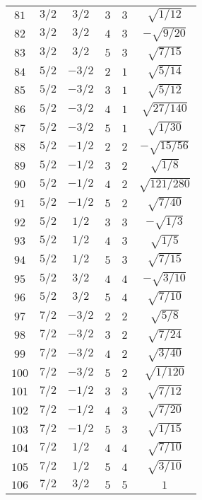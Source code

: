 \begin{table}
\begin{center}
\begin{tabular}{|c|c|c|c|c|c|}
$81$ & $3/2$ & $3/2$ & $3$ & $3$ & $\sqrt{1/12}$ \\ 
$82$ & $3/2$ & $3/2$ & $4$ & $3$ & $-\sqrt{9/20}$ \\ 
$83$ & $3/2$ & $3/2$ & $5$ & $3$ & $\sqrt{7/15}$ \\ 
$84$ & $5/2$ & $-3/2$ & $2$ & $1$ & $\sqrt{5/14}$ \\ 
$85$ & $5/2$ & $-3/2$ & $3$ & $1$ & $\sqrt{5/12}$ \\ 
$86$ & $5/2$ & $-3/2$ & $4$ & $1$ & $\sqrt{27/140}$ \\ 
$87$ & $5/2$ & $-3/2$ & $5$ & $1$ & $\sqrt{1/30}$ \\ 
$88$ & $5/2$ & $-1/2$ & $2$ & $2$ & $-\sqrt{15/56}$ \\ 
$89$ & $5/2$ & $-1/2$ & $3$ & $2$ & $\sqrt{1/8}$ \\ 
$90$ & $5/2$ & $-1/2$ & $4$ & $2$ & $\sqrt{121/280}$ \\ 
$91$ & $5/2$ & $-1/2$ & $5$ & $2$ & $\sqrt{7/40}$ \\ 
$92$ & $5/2$ & $1/2$ & $3$ & $3$ & $-\sqrt{1/3}$ \\ 
$93$ & $5/2$ & $1/2$ & $4$ & $3$ & $\sqrt{1/5}$ \\ 
$94$ & $5/2$ & $1/2$ & $5$ & $3$ & $\sqrt{7/15}$ \\ 
$95$ & $5/2$ & $3/2$ & $4$ & $4$ & $-\sqrt{3/10}$ \\ 
$96$ & $5/2$ & $3/2$ & $5$ & $4$ & $\sqrt{7/10}$ \\ 
$97$ & $7/2$ & $-3/2$ & $2$ & $2$ & $\sqrt{5/8}$ \\ 
$98$ & $7/2$ & $-3/2$ & $3$ & $2$ & $\sqrt{7/24}$ \\ 
$99$ & $7/2$ & $-3/2$ & $4$ & $2$ & $\sqrt{3/40}$ \\ 
$100$ & $7/2$ & $-3/2$ & $5$ & $2$ & $\sqrt{1/120}$ \\ 
$101$ & $7/2$ & $-1/2$ & $3$ & $3$ & $\sqrt{7/12}$ \\ 
$102$ & $7/2$ & $-1/2$ & $4$ & $3$ & $\sqrt{7/20}$ \\ 
$103$ & $7/2$ & $-1/2$ & $5$ & $3$ & $\sqrt{1/15}$ \\ 
$104$ & $7/2$ & $1/2$ & $4$ & $4$ & $\sqrt{7/10}$ \\ 
$105$ & $7/2$ & $1/2$ & $5$ & $4$ & $\sqrt{3/10}$ \\ 
$106$ & $7/2$ & $3/2$ & $5$ & $5$ & $1$ \\ 
\hline 
\end{tabular}
\end{center}
\end{table}

